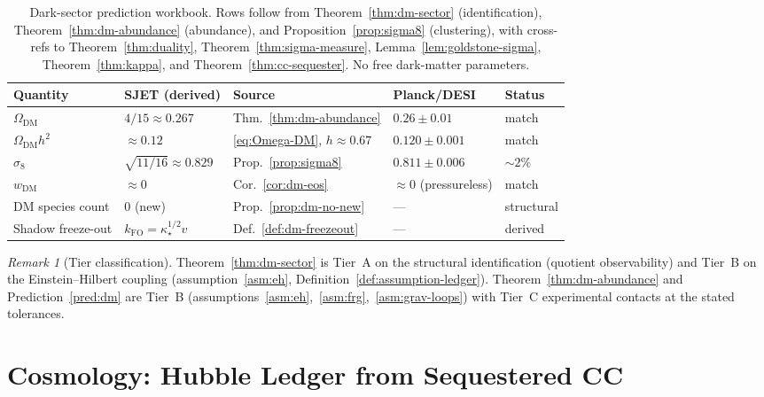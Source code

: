 \documentclass[11pt]{article}
\theoremstyle{plain}
\theoremstyle{definition}
\theoremstyle{remark}
\newtheorem{remark}[theorem]{Remark}
\numberwithin{equation}{section}
\begin{document}
\begin{table}[ht]
\centering
\small
\renewcommand{\arraystretch}{1.12}
\begin{tabular}{@{}lllll@{}}
\toprule
\textbf{Quantity} & \textbf{SJET (derived)} & \textbf{Source} & \textbf{Planck/DESI} & \textbf{Status} \\
\midrule
$\Omega_{\mathrm{DM}}$ & $4/15\approx 0.267$ & Thm.~\ref{thm:dm-abundance} & $0.26\pm 0.01$ & match \\
$\Omega_{\mathrm{DM}}h^2$ & $\approx 0.12$ & \eqref{eq:Omega-DM}, $h\approx 0.67$ & $0.120\pm 0.001$ & match \\
$\sigma_8$ & $\sqrt{11/16}\approx 0.829$ & Prop.~\ref{prop:sigma8} & $0.811\pm 0.006$ & $\sim 2\%$ \\
$w_{\mathrm{DM}}$ & $\approx 0$ & Cor.~\ref{cor:dm-eos} & $\approx 0$ (pressureless) & match \\
DM species count & $0$ (new) & Prop.~\ref{prop:dm-no-new} & --- & structural \\
Shadow freeze-out & $k_{\mathrm{FO}}=\kappa_\star^{1/2}v$ & Def.~\ref{def:dm-freezeout} & --- & derived \\
\bottomrule
\end{tabular}
\caption{Dark-sector prediction workbook. Rows follow from
Theorem~\ref{thm:dm-sector} (identification),
Theorem~\ref{thm:dm-abundance} (abundance), and
Proposition~\ref{prop:sigma8} (clustering), with cross-refs to
Theorem~\ref{thm:duality}, Theorem~\ref{thm:sigma-measure},
Lemma~\ref{lem:goldstone-sigma}, Theorem~\ref{thm:kappa}, and
Theorem~\ref{thm:cc-sequester}. No free dark-matter parameters.}
\label{tab:dark-sector}
\end{table}

\begin{remark}[Tier classification]
Theorem~\ref{thm:dm-sector} is Tier~A on the structural identification
(quotient observability) and Tier~B on the Einstein--Hilbert coupling
(assumption~\ref{asm:eh}, Definition~\ref{def:assumption-ledger}).
Theorem~\ref{thm:dm-abundance} and Prediction~\ref{pred:dm} are Tier~B
(assumptions~\ref{asm:eh},~\ref{asm:frg},~\ref{asm:grav-loops}) with
Tier~C experimental contacts at the stated tolerances.
\end{remark}%
\section{Cosmology: Hubble Ledger from Sequestered CC}
\label{sec:cosmology}
\end{document}
